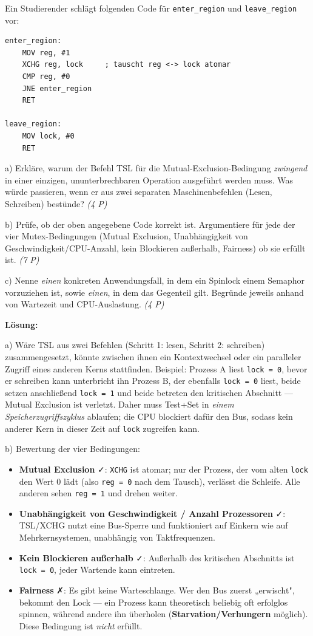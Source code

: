 \documentclass[11pt, a4paper]{article}
\begin{document}
Ein Studierender schlägt folgenden Code für \texttt{enter\_region} und \texttt{leave\_region} vor:


\begin{lstlisting}
enter_region:
    MOV reg, #1
    XCHG reg, lock     ; tauscht reg <-> lock atomar
    CMP reg, #0
    JNE enter_region
    RET

leave_region:
    MOV lock, #0
    RET
\end{lstlisting}


a) Erkläre, warum der Befehl TSL für die Mutual-Exclusion-Bedingung \textit{zwingend} in einer einzigen, ununterbrechbaren Operation ausgeführt werden muss. Was würde passieren, wenn er aus zwei separaten Maschinenbefehlen (Lesen, Schreiben) bestünde? \textit{(4 P)}


b) Prüfe, ob der oben angegebene Code korrekt ist. Argumentiere für jede der vier Mutex-Bedingungen (Mutual Exclusion, Unabhängigkeit von Geschwindigkeit/CPU-Anzahl, kein Blockieren außerhalb, Fairness) ob sie erfüllt ist. \textit{(7 P)}


c) Nenne \textit{einen} konkreten Anwendungsfall, in dem ein Spinlock einem Semaphor vorzuziehen ist, sowie \textit{einen}, in dem das Gegenteil gilt. Begründe jeweils anhand von Wartezeit und CPU-Auslastung. \textit{(4 P)}


\textbf{Lösung:}


a) Wäre TSL aus zwei Befehlen (Schritt 1: lesen, Schritt 2: schreiben) zusammengesetzt, könnte zwischen ihnen ein Kontextwechsel oder ein paralleler Zugriff eines anderen Kerns stattfinden. Beispiel: Prozess A liest \texttt{lock = 0}, bevor er schreiben kann unterbricht ihn Prozess B, der ebenfalls \texttt{lock = 0} liest, beide setzen anschließend \texttt{lock = 1} und beide betreten den kritischen Abschnitt — Mutual Exclusion ist verletzt. Daher muss Test+Set in \textit{einem Speicherzugriffszyklus} ablaufen; die CPU blockiert dafür den Bus, sodass kein anderer Kern in dieser Zeit auf \texttt{lock} zugreifen kann.


b) Bewertung der vier Bedingungen:


\begin{itemize}
  \item \textbf{Mutual Exclusion} ✓: \texttt{XCHG} ist atomar; nur der Prozess, der vom alten \texttt{lock} den Wert 0 lädt (also \texttt{reg = 0} nach dem Tausch), verlässt die Schleife. Alle anderen sehen \texttt{reg = 1} und drehen weiter.
  \item \textbf{Unabhängigkeit von Geschwindigkeit / Anzahl Prozessoren} ✓: TSL/XCHG nutzt eine Bus-Sperre und funktioniert auf Einkern wie auf Mehrkernsystemen, unabhängig von Taktfrequenzen.
  \item \textbf{Kein Blockieren außerhalb} ✓: Außerhalb des kritischen Abschnitts ist \texttt{lock = 0}, jeder Wartende kann eintreten.
  \item \textbf{Fairness} ✗: Es gibt keine Warteschlange. Wer den Bus zuerst „erwischt", bekommt den Lock — ein Prozess kann theoretisch beliebig oft erfolglos spinnen, während andere ihn überholen (\textbf{Starvation/Verhungern} möglich). Diese Bedingung ist \textit{nicht} erfüllt.
\end{itemize}
\end{document}
